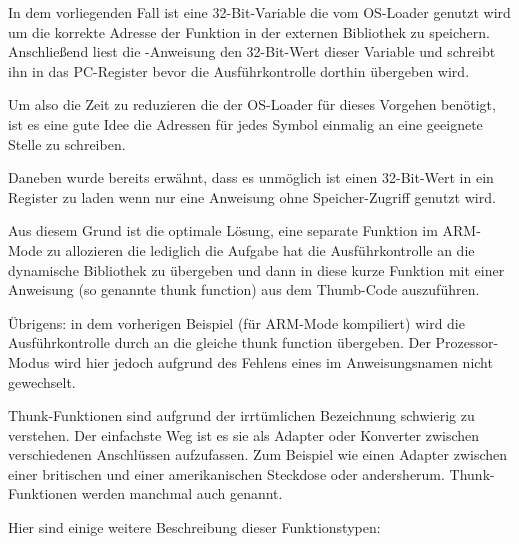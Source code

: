 In dem vorliegenden Fall ist  eine 32-Bit-Variable die vom \ac{OS}-Loader genutzt wird
um die korrekte Adresse der Funktion in der externen Bibliothek zu speichern.
Anschließend liest die -Anweisung den 32-Bit-Wert dieser Variable und schreibt ihn in das \ac{PC}-Register
bevor die Ausführkontrolle dorthin übergeben wird.

Um also die Zeit zu reduzieren die der \ac{OS}-Loader für dieses Vorgehen benötigt, ist es eine gute Idee
die Adressen für jedes Symbol einmalig an eine geeignete Stelle zu schreiben.

Daneben wurde bereits erwähnt, dass es unmöglich ist einen 32-Bit-Wert in ein Register zu laden wenn
nur eine Anweisung ohne Speicher-Zugriff genutzt wird.

Aus diesem Grund ist die optimale Lösung, eine separate Funktion im ARM-Mode zu allozieren die lediglich
die Aufgabe hat die Ausführkontrolle an die dynamische Bibliothek zu übergeben und dann in diese kurze
Funktion mit einer Anweisung (so genannte \gls{thunk function}) aus dem Thumb-Code auszuführen.

Übrigens: in dem vorherigen Beispiel (für ARM-Mode kompiliert) wird die Ausführkontrolle durch 
an die gleiche \gls{thunk function} übergeben.
Der Prozessor-Modus wird hier jedoch aufgrund des Fehlens eines  im Anweisungsnamen nicht gewechselt.


Thunk-Funktionen sind aufgrund der irrtümlichen Bezeichnung schwierig zu verstehen.
Der einfachste Weg ist es sie als Adapter oder Konverter zwischen verschiedenen Anschlüssen aufzufassen.
Zum Beispiel wie einen Adapter zwischen einer britischen und einer amerikanischen Steckdose oder andersherum.
Thunk-Funktionen werden manchmal auch  genannt.

Hier sind einige weitere Beschreibung dieser Funktionstypen:

